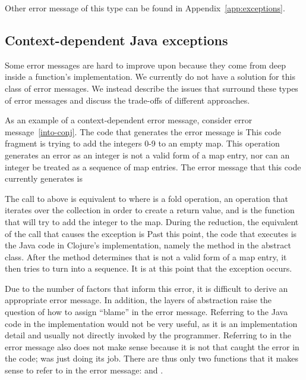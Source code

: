 \documentclass[12pt]{article}
\begin{document}
Other error message of this type can be found in Appendix~\ref{app:exceptions}.

\subsection{Context-dependent Java exceptions}
\label{subsec:context-dep}
Some error messages are hard to improve upon because they come from deep inside a
function's implementation. We currently do not have a solution for this class of
error messages. We instead describe the issues that surround these types of
error messages 
and discuss the trade-offs of different approaches.

As an example of a context-dependent error message, consider error
message~\ref{into-conj}. The code that generates the error message is
This code fragment is trying to add the integers 0-9 to an empty map. This
operation generates an error as an integer is not a valid form of a map
entry, nor can an integer be treated as a sequence of map entries. The error
message that this code currently generates is

The call to  above is
equivalent to
where  is a fold operation, an operation that iterates over the collection in order to create a return value,
and  is the function that
will try to add the integer to the map. During the reduction, the equivalent of
the call that causes the exception is
Past this point, the code that executes is the Java code in Clojure's
implementation, namely the  method in the
 abstract class. After the  method
determines that  is not a valid form of a map entry, it then tries to
turn  into a sequence. It is at this point that the exception occurs.

Due to the number of factors that inform this error, it
is difficult to derive an appropriate error message. In addition, the layers of
abstraction raise the question of how to assign ``blame'' in the error
message. Referring to the Java code in the implementation would not be very
useful, as it is an implementation detail and usually not directly invoked by the
programmer. Referring to  in the error message also does not make 
sense because it is not  that caught the error in the code;
 was just doing its job. There are thus only two functions that it
makes sense to refer to in the error message:  and .
\end{document}
